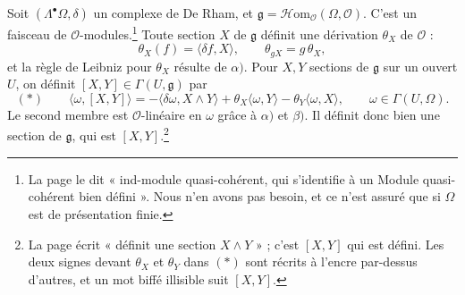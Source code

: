 \documentclass[11pt,a4paper]{article}
\begin{document}
Soit $(\Lambda^{\bullet}\Omega, \delta)$ un complexe de De Rham, et
$\mathfrak{g} = \mathcal{H}\mathrm{om}_{\mathcal{O}}(\Omega, \mathcal{O})$.
C'est un faisceau de $\mathcal{O}$-modules.\footnote{La page le dit
« ind-module quasi-cohérent, qui s'identifie à un Module quasi-cohérent bien
défini ». Nous n'en avons pas besoin, et ce n'est assuré que si $\Omega$ est de
présentation finie.} Toute section $X$ de $\mathfrak{g}$ définit une dérivation
$\theta_X$ de $\mathcal{O}$ :
\[
\theta_X(f) = \langle \delta f, X \rangle ,
\qquad
\theta_{gX} = g\,\theta_X ,
\]
et la règle de Leibniz pour $\theta_X$ résulte de $\alpha)$. Pour $X, Y$
sections de $\mathfrak{g}$ sur un ouvert $U$, on définit $[X,Y] \in \Gamma(U,
\mathfrak{g})$ par
\[
(*)\qquad \langle \omega, [X,Y] \rangle
= -\langle \delta\omega, X \wedge Y \rangle + \theta_X \langle \omega, Y \rangle
- \theta_Y \langle \omega, X \rangle ,
\qquad \omega \in \Gamma(U, \Omega).
\]
Le second membre est $\mathcal{O}$-linéaire en $\omega$ grâce à $\alpha)$ et
$\beta)$. Il définit donc bien une section de $\mathfrak{g}$, qui est
$[X,Y]$.\footnote{La page écrit « définit une section $X \wedge Y$ » ; c'est
$[X,Y]$ qui est défini. Les deux signes devant $\theta_X$ et $\theta_Y$ dans
$(*)$ sont récrits à l'encre par-dessus d'autres, et un mot biffé illisible
suit $[X,Y]$.}
\end{document}
